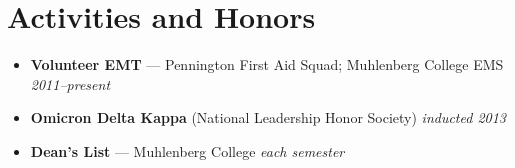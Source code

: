 \documentclass[11pt]{article}
\begin{document}
\section*{Activities and Honors}
\begin{itemize}
  \item \textbf{Volunteer EMT} --- Pennington First Aid Squad; Muhlenberg College EMS \hfill {\em 2011--present}
  \item \textbf{Omicron Delta Kappa} (National Leadership Honor Society) \hfill {\em inducted 2013}
  \item \textbf{Dean's List} --- Muhlenberg College \hfill {\em each semester}
\end{itemize}
\end{document}
